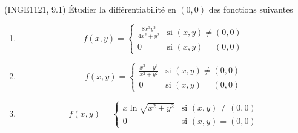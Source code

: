 
\begin{exercice}\label{exoFoncDeuxVar0019}

	(INGE1121, 9.1) Étudier la différentiabilité en $(0,0)$ des fonctions suivantes
	\begin{enumerate}

		\item
			\begin{equation}
				f(x,y)=\begin{cases}
					\frac{ 8x^3y^3 }{ 4x^2+y^2 }	&	\text{si $(x,y)\neq (0,0)$}\\
					0	&	 \text{si $(x,y)=(0,0)$}
				\end{cases}
			\end{equation}
		\item
			\begin{equation}
				f(x,y)=\begin{cases}
					\frac{ x^3-y^3 }{ x^2+y^2 }	&	\text{si $(x,y)\neq (0,0)$}\\
					0	&	 \text{si $(x,y)=(0,0)$}
				\end{cases}
			\end{equation}
			
		\item
			\begin{equation}
				f(x,y)=\begin{cases}
					x\ln\sqrt{x^2+y^2}	&	\text{si $(x,y)\neq (0,0)$}\\
					0	&	 \text{si $(x,y)=(0,0)$}
				\end{cases}
			\end{equation}

	\end{enumerate}

\end{exercice}
